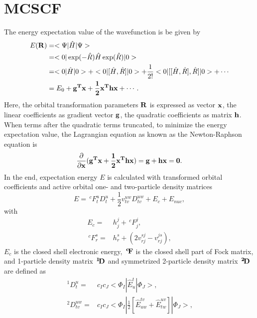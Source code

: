 \documentclass[a4paper,12pt,oneside]{book}
\newcommand{\pre}[1]{\,#1\!}
\begin{document}
\section{MCSCF}
The energy expectation value of the wavefunction is be given by
\begin{equation}
\begin{aligned}
E(\bf{R}) &= <\Psi|\hat{H}|\Psi> \\
&= <0|\exp(-\hat{R})\hat{H}\exp(\hat{R})|0> \\
&= <0|\hat{H}|0> + <0|[\hat{H},\hat{R}]|0> + \frac{1}{2!}< 0|[[\hat{H},\hat{R}], \hat{R}]|0> + \cdots\\
&= E_0+\bf{g}^T\bf{x} +\frac{1}{2} \bf{x}^T\bf{hx}+ \cdots.\\
\end{aligned}
\end{equation}
Here, the orbital transformation parameters $\bf{R}$ is expressed as vector $\bf{x}$, 
the linear coefficients as gradient vector $\bf{g}$, 
the quadratic coefficients as matrix $\bf{h}$. When terms after the quadratic terms truncated, 
to minimize the energy expectation value, the Lagrangian equation as known as the Newton-Raphson equation is
\begin{equation}
\frac{\partial}{\partial \bf{x}}(\bf{g}^T\bf{x}+\frac{1}{2}\bf{x}^T\bf{hx})= \bf{g}+\bf{hx} =0.
\end{equation}
In the end, expectation energy $E$ is calculated with transformed orbital coefficients and active orbital one- and two-particle density matrices
\begin{equation}
E=\pre{^c}F_t^uD_t^u+\frac{1}{2}v^{uw}_{tv}D_{tv}^{uw}+E_c+E_{nuc},
\end{equation}
with
\begin{equation}
\begin{aligned}
  E_c=&h^j_j+\pre{^c}F_j^j,\\
  \pre{^c}F_r^s =& h^s_r+(2v^{sj}_{rj}-v^{js}_{rj}), 
\end{aligned}
\end{equation}
$E_c$ is the closed shell electronic energy, $\bf{\pre{^c}F}$ is the closed shell part of Fock matrix, 
and 1-particle density matrix $\bf{\pre{^1}D}$ and symmetrized  2-particle density matrix $\bf{\pre{^2}D}$ are defined as 
\begin{equation}
\begin{aligned}
  \pre{^1}D_t^u =& c_Ic_J<\Phi_I|\hat{E}^t_u|\Phi_J>,\\
  \pre{^2}D_{tv}^{uw} =& c_Ic_J<\Phi_I|\frac{1}{2}[\hat{E}^{tv}_{uw}+\hat{E}^{uv}_{tw}]|\Phi_J>,
\end{aligned}
\end{equation}
\end{document}
